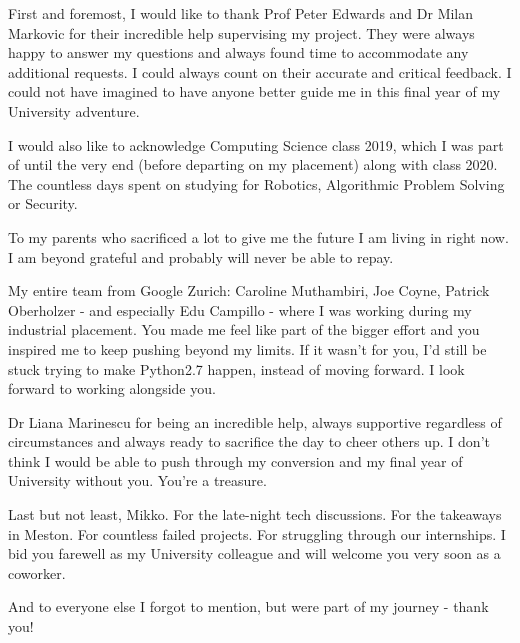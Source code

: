 \documentclass[msci]{abdnthesis}
\begin{document}
\begin{acknowledgements}
  First and foremost, I would like to thank Prof Peter Edwards and Dr Milan Markovic for their incredible help supervising my project. They were always happy to answer my questions and always found time to accommodate any additional requests. I could always count on their accurate and critical feedback. I could not have imagined to have anyone better guide me in this final year of my University adventure.

  I would also like to acknowledge Computing Science class 2019, which I was part of until the very end (before departing on my placement) along with class 2020. The countless days spent on studying for Robotics, Algorithmic Problem Solving or Security.

  To my parents who sacrificed a lot to give me the future I am living in right now. I am beyond grateful and probably will never be able to repay.

  My entire team from Google Zurich: Caroline Muthambiri, Joe Coyne, Patrick Oberholzer - and especially Edu Campillo - where I was working during my industrial placement. You made me feel like part of the bigger effort and you inspired me to keep pushing beyond my limits. If it wasn't for you, I'd still be stuck trying to make Python2.7 happen, instead of moving forward. I look forward to working alongside you.

  Dr Liana Marinescu for being an incredible help, always supportive regardless of circumstances and always ready to sacrifice the day to cheer others up. I don't think I would be able to push through my conversion and my final year of University without you. You're a treasure.

  Last but not least, Mikko. For the late-night tech discussions. For the takeaways in Meston. For countless failed projects. For struggling through our internships. I bid you farewell as my University colleague and will welcome you very soon as a coworker.

 And to everyone else I forgot to mention, but were part of my journey - thank you! 

  
\end{acknowledgements}



\tableofcontents

\printnoidxglossary[type=\acronymtype,title=Abbreviations,nonumberlist]









\appendix




\end{document}
